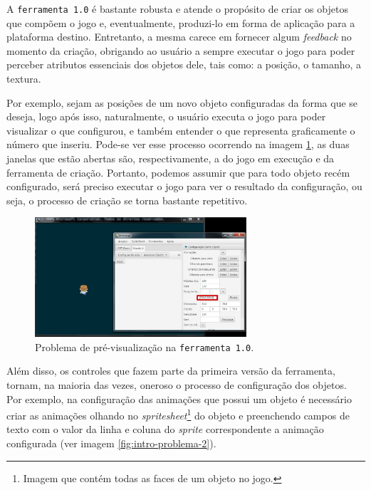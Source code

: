 \documentclass[12pt,twoside,openright,a4paper,english,brazil,sumario=tradicional]{abntex2}
\begin{document}
A \texttt{ferramenta 1.0} é bastante robusta e atende o propósito de criar os objetos que compõem o jogo e, eventualmente, produzi-lo em forma de aplicação para a plataforma destino. Entretanto, a mesma carece em fornecer algum \emph{feedback} no momento da criação, obrigando ao usuário a sempre executar o jogo para poder perceber atributos essenciais dos objetos dele, tais como: a posição, o tamanho, a textura.

Por exemplo, sejam as posições de um novo objeto configuradas da forma que se deseja, logo após isso, naturalmente, o usuário executa o jogo para poder visualizar o que configurou, e também entender o que representa graficamente o número que inseriu. Pode-se ver esse processo ocorrendo na imagem \ref{fig:intro-problema-1}, as duas janelas que estão abertas são, respectivamente, a do jogo em execução e da ferramenta de criação. Portanto, podemos assumir que para todo objeto recém configurado, será preciso executar o jogo para ver o resultado da configuração, ou seja, o processo de criação se torna bastante repetitivo.

\begin{figure}[h]
   \centering
   \includegraphics[width=0.7\textwidth]{images/problema-1.jpg}
   \caption{Problema de pré-visualização na \texttt{ferramenta 1.0}.}
   \label{fig:intro-problema-1}
\end{figure}

Além disso, os controles que fazem parte da primeira versão da ferramenta, tornam, na maioria das vezes, oneroso o processo de configuração dos objetos. Por exemplo, na configuração das animações que possui um objeto é necessário criar as animações olhando no \emph{spritesheet}\footnote{Imagem que contém todas as faces de um objeto no jogo.} do objeto e preenchendo campos de texto com o valor da linha e coluna do \emph{sprite} correspondente a animação configurada (ver imagem \ref{fig:intro-problema-2}).
\end{document}

